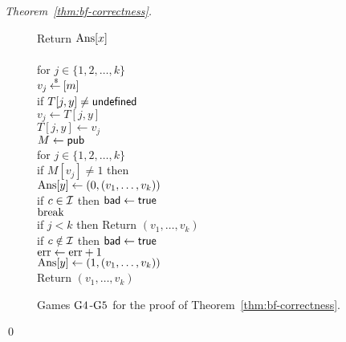 \begin{proof}[Theorem~\ref{thm:bf-correctness}]
\begin{figure}[tp]
{{Return $\mathrm{Ans}[x]$\\
%
}
{
\\
for $j \in \{1,2,\ldots,k\}$\\
\nudge $v_j {\:\stackrel{{\scriptscriptstyle \hspace{0.2em}\$}} {\leftarrow}\:} [m]$\\
\nudge if $T[j,y] \neq \mathsf{undefined}$\\
\nudge \nudge $v_j \gets T[j,y]$\\
\nudge $T[j,y] \gets v_j$\\
%
$M \gets{\sf pub}$\\
for $j \in \{1,2,\ldots,k\}$\\
\nudge if $M[v_j] \neq 1$ then \\
\nudge \nudge $\mathrm{Ans}[y] \gets (0, (v_1, \ldots, v_{k}) )$\\
\nudge \nudge if $c \in {\cal I}$ then $\mathsf{bad} \gets \mathsf{true}$\\
\nudge \nudge $\mathrm{break}$\\
if $j < k$ then Return $\left(v_1,\ldots,v_k\right)$\\
if $c \notin {\cal I}$ then $\mathsf{bad} \gets \mathsf{true}$\\
$\mathrm{err} \gets \mathrm{err} +1$\\
$\mathrm{Ans}[y] \gets (1, (v_1, \ldots, v_{k}))$\\
Return $\left(v_1,\ldots,v_k\right)$
}
}
\caption{Games $\text{G4}$-$\text{G5}$ for the
proof of Theorem~\ref{thm:bf-correctness}.}
\label{fig:bf-correctness-games2}
\end{figure}
\hfill\qed
\end{proof}
